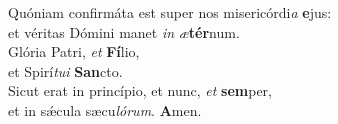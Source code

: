 \evenverse Quóniam confirmáta est super nos misericórdi\textit{a} \textbf{e}jus:~\*\\
\evenverse et véritas Dómini manet \textit{in} \textit{æ}\textbf{tér}num.\\
\oddverse Glória Patri, \textit{et} \textbf{Fí}lio,~\*\\
\oddverse et Spirí\textit{tu}\textit{i} \textbf{San}cto.\\
\evenverse Sicut erat in princípio, et nunc, \textit{et} \textbf{sem}per,~\*\\
\evenverse et in sǽcula sæcu\textit{ló}\textit{rum}. \textbf{A}men.\\
